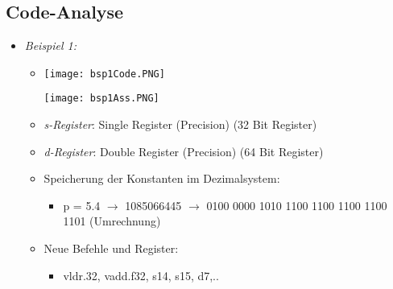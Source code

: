 \pagebreak

\subsection{Code-Analyse}
    \begin{itemize}
        \item \textit{Beispiel 1:}
            \begin{itemize}
                \item[]
                    \begin{minipage}{0.5\textwidth}
                        \texttt{[image: bsp1Code.PNG]}
                    \end{minipage}
                    \begin{minipage}{0.4\textwidth}
                        \texttt{[image: bsp1Ass.PNG]}
                    \end{minipage}
                \item \textit{s-Register}: Single Register (Precision) (32 Bit Register)
                \item \textit{d-Register}: Double Register (Precision) (64 Bit Register)
                \item Speicherung der Konstanten im Dezimalsystem:
                    \begin{itemize}
                        \item[] p = 5.4 $\rightarrow$ 1085066445 $\rightarrow$ 0100 0000 1010 1100 1100 1100 1100 1101 (Umrechnung)
                    \end{itemize}
                \item Neue Befehle und Register:
                    \begin{itemize}
                        \item[] vldr.32, vadd.f32, s14, s15, d7,..
                    \end{itemize}
            \end{itemize}


\end{itemize}
